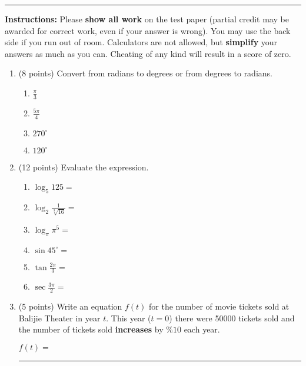 \documentclass[11pt]{article}
\begin{document}
\Large


\medskip\hrule
\vspace{20pt}

\noindent \textbf{Instructions:} Please \textbf{show all work} on the test paper (partial credit may be awarded for correct work, even if your answer is wrong). You may use the back side if you run out of room. Calculators are not allowed, but \textbf{simplify} your answers as much as you can. Cheating of any kind will result in a score of zero.

\vspace{10pt}

\begin{enumerate}

\item (8 points) Convert from radians to degrees or from degrees to radians.
\begin{multicols}{2}
\begin{enumerate}[itemsep=30pt]
    \item $\frac{\pi}{3}$
    \item $\frac{5\pi}{4}$
    \item $270^{\circ}$
    \item $120^{\circ}$
\end{enumerate}
\end{multicols}
\vspace{30pt}


\item (12 points) Evaluate the expression.
\begin{multicols}{2}
\begin{enumerate}[itemsep=60pt]
    \item $\log_{5}{125} = $
    \item $\log_{2}{\frac{1}{\sqrt[3]{16}}} = $
    \item $\log_{\pi}{\pi^5} = $
    \item $\sin{45^{\circ}} = $
    \item $\tan{\frac{2\pi}{3}} = $
    \item $\sec{\frac{3\pi}{2}} = $
\end{enumerate}
\end{multicols}
\vspace{60pt}


\item (5 points) Write an equation $f(t)$ for the number of movie tickets sold at Balijie Theater in year $t$. This year ($t=0$) there were 50000 tickets sold and the number of tickets sold \textbf{increases} by $\%10$ each year.
\begin{flushright}
$f(t) =$ \rule{4cm}{0.4pt}
\end{flushright}



\end{enumerate}
\end{document}
